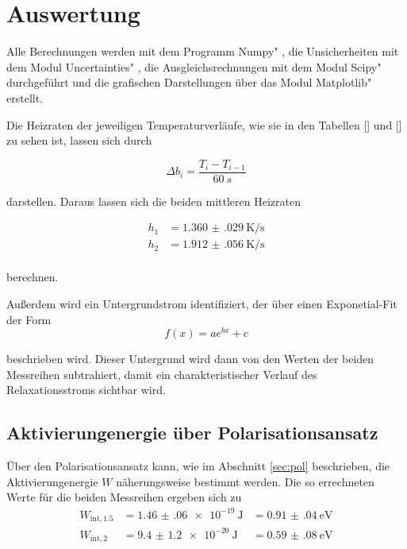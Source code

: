 \section{Auswertung}
\label{sec:Auswertung}
Alle Berechnungen werden mit dem Programm \glqq Numpy" \cite{numpy}, die Unsicherheiten mit dem Modul \glqq Uncertainties" \cite{uncertainties}, die Ausgleichsrechnungen mit dem Modul \glqq Scipy" \cite{scipy} durchgeführt und die grafischen Darstellungen über das Modul \glqq Matplotlib" \cite{matplotlib} erstellt.

Die Heizraten der jeweiligen Temperaturverläufe, wie sie in den Tabellen [] und [] zu sehen ist, lassen sich durch 

\begin{equation}
    \Delta b_i = \frac{T_i - T_{i-1}}{\SI{60}{s} }
\end{equation}

darstellen. Daraus lassen sich die beiden mittleren Heizraten 

\begin{align*}
    h_1 &=  \SI{1.360(029)}{\kelvin\per\second} \\
    h_2 &=  \SI{1.912(056)}{\kelvin\per\second} \\
\end{align*}

berechnen. 

Außerdem wird ein Untergrundstrom identifiziert, der über einen Exponetial-Fit der Form 
\begin{equation}
    f(x) = a e^{bx} + c
\end{equation}

beschrieben wird. Dieser Untergrund wird dann von den Werten der beiden Messreihen subtrahiert, damit ein charakteristischer Verlauf des Relaxationsstroms sichtbar wird. 

\subsection{Aktivierungenergie über Polarisationsansatz}

Über den Polarisationsansatz kann, wie im Abschnitt \ref{sec:pol} beschrieben, die Aktivierungenergie $W$ näherungsweise bestimmt werden.
Die so errechneten Werte für die beiden Messreihen ergeben sich zu 
\begin{align*}
    W_{\text{int},1.5} &= \SI{1.46(06)e-19}{\joule} &= \SI{0.91(04)}{\electronvolt} \\
    W_{\text{int},2}   &= \SI{9.4(12)e-20}{\joule} &= \SI{0.59(08)}{\electronvolt} \\
\end{align*}



